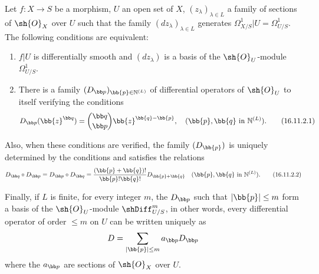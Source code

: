 \begin{theorem}[16.11.2]
\label{IV.16.11.2}
Let $f:X \to S$ be a morphism, $U$ an open set of $X$, $(z_\lambda)_{\lambda \in L}$ a family of sections of $\sh{O}_X$ over $U$ such that the family $(dz_\lambda)_{\lambda \in L}$ generates $\Omega_{X/S}^1|U = \Omega_{U/S}^1$.
The following conditions are equivalent:
\begin{enumerate}
  \item[(a)] $f|U$ is differentially smooth and $(dz_\lambda)$ is a basis of the $\sh{O}_U$-module $\Omega_{U/S}^1$.
  \item[(b)] There is a family $(D_{\bb p})_{\bb{p} \in \mathbb{N}^{(L)}}$ of differential operators of $\sh{O}_U$ to itself verifying the conditions
  \[
    \label{IV.16.11.2.1}
    D_{\bb p} (\bb{z}^{\bb q}) = \binom{\bb q}{\bb p} \bb{z}^{\bb{q} - \bb{p}}, \quad (\bb{p}, \bb{q} \text{ in } \mathbb{N}^{(L)}).
    \tag{16.11.2.1}
  \]
\end{enumerate}

Also, when these conditions are verified, the family $(D_\bb{p})$ is uniquely determined by the conditions  and satisfies the relations
\[
  \label{IV.16.11.2.2}
  D_{\bb q} \circ D_{\bb p} = D_{\bb p} \circ D_{\bb q} = \frac{(\bb{p} + \bb{q})!}{\bb{p}!\bb{q}!}D_{\bb{p} + \bb{q}} \quad (\bb{p}, \bb{q} \text{ in }  \mathbb{N}^{(L)}).
  \tag{16.11.2.2}
\]

Finally, if $L$ is finite, for every integer $m$, the $D_{\bb p}$ such that $|\bb{p}| \leq m$ form a basis of the $\sh{O}_U$-module $\shDiff_{U/S}^m$, in other words, every differential operator of order $\leq m$ on $U$ can be written uniquely as
\[
  D = \sum_{|\bb{p}| \leq m} a_{\bb p} D_{\bb p}
\] 
where the $a_{\bb p}$ are sections of $\sh{O}_X$ over $U$.
\end{theorem}

